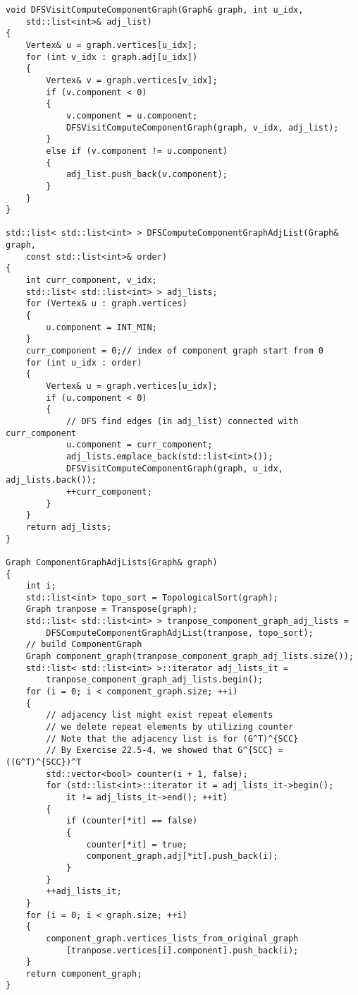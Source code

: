 \begin{verbatim}
void DFSVisitComputeComponentGraph(Graph& graph, int u_idx, 
    std::list<int>& adj_list)
{
    Vertex& u = graph.vertices[u_idx];
    for (int v_idx : graph.adj[u_idx])
    {
        Vertex& v = graph.vertices[v_idx];
        if (v.component < 0)
        {
            v.component = u.component;
            DFSVisitComputeComponentGraph(graph, v_idx, adj_list);
        }
        else if (v.component != u.component)
        {
            adj_list.push_back(v.component);
        }
    }
}

std::list< std::list<int> > DFSComputeComponentGraphAdjList(Graph& graph, 
    const std::list<int>& order)
{
    int curr_component, v_idx;
    std::list< std::list<int> > adj_lists;
    for (Vertex& u : graph.vertices)
    {
        u.component = INT_MIN;
    }
    curr_component = 0;// index of component graph start from 0
    for (int u_idx : order)
    {
        Vertex& u = graph.vertices[u_idx];
        if (u.component < 0)
        {
            // DFS find edges (in adj_list) connected with curr_component
            u.component = curr_component;
            adj_lists.emplace_back(std::list<int>());
            DFSVisitComputeComponentGraph(graph, u_idx, adj_lists.back());
            ++curr_component;
        }
    }
    return adj_lists;
}

Graph ComponentGraphAdjLists(Graph& graph)
{
    int i;
    std::list<int> topo_sort = TopologicalSort(graph);
    Graph tranpose = Transpose(graph);
    std::list< std::list<int> > tranpose_component_graph_adj_lists = 
        DFSComputeComponentGraphAdjList(tranpose, topo_sort);
    // build ComponentGraph
    Graph component_graph(tranpose_component_graph_adj_lists.size());
    std::list< std::list<int> >::iterator adj_lists_it = 
        tranpose_component_graph_adj_lists.begin();
    for (i = 0; i < component_graph.size; ++i)
    {
        // adjacency list might exist repeat elements
        // we delete repeat elements by utilizing counter
        // Note that the adjacency list is for (G^T)^{SCC}
        // By Exercise 22.5-4, we showed that G^{SCC} = ((G^T)^{SCC})^T
        std::vector<bool> counter(i + 1, false);
        for (std::list<int>::iterator it = adj_lists_it->begin();
            it != adj_lists_it->end(); ++it)
        {
            if (counter[*it] == false)
            {
                counter[*it] = true;
                component_graph.adj[*it].push_back(i);
            }
        }
        ++adj_lists_it;
    }
    for (i = 0; i < graph.size; ++i)
    {
        component_graph.vertices_lists_from_original_graph
            [tranpose.vertices[i].component].push_back(i);
    }
    return component_graph;
}
\end{verbatim}

